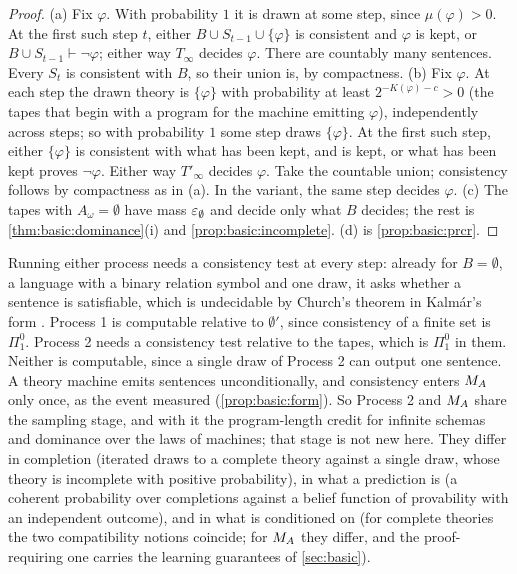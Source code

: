 \begin{proof}
(a) Fix $\varphi$. With probability $1$ it is drawn at some step, since $\mu(\varphi)>0$. At the first such step $t$, either $B\cup S_{t-1}\cup\{\varphi\}$ is consistent and $\varphi$ is kept, or $B\cup S_{t-1}\vdash\neg\varphi$; either way $T_\infty$ decides $\varphi$. There are countably many sentences. Every $S_t$ is consistent with $B$, so their union is, by compactness.
(b) Fix $\varphi$. At each step the drawn theory is $\{\varphi\}$ with probability at least $2^{-K(\varphi)-c}>0$ (the tapes that begin with a program for the machine emitting $\varphi$), independently across steps; so with probability $1$ some step draws $\{\varphi\}$. At the first such step, either $\{\varphi\}$ is consistent with what has been kept, and is kept, or what has been kept proves $\neg\varphi$. Either way $T'_\infty$ decides $\varphi$. Take the countable union; consistency follows by compactness as in (a). In the variant, the same step decides $\varphi$.
(c) The tapes with $A_\omega=\emptyset$ have mass $\varepsilon_{\emptyset}$ and decide only what $B$ decides; the rest is \cref{thm:basic:dominance}(i) and \cref{prop:basic:incomplete}.
(d) is \cref{prop:basic:prcr}.
\end{proof}

Running either process needs a consistency test at every step: already for $B=\emptyset$, a language with a binary relation symbol and one draw, it asks whether a sentence is satisfiable, which is undecidable by Church's theorem in Kalmár's form \citep{church1936note,kalmar1937zuruckfuhrung}. Process 1 is computable relative to $\emptyset'$, since consistency of a finite set is $\Pi^0_1$. Process 2 needs a consistency test relative to the tapes, which is $\Pi^0_1$ in them. Neither is computable, since a single draw of Process 2 can output one sentence. A theory machine emits sentences unconditionally, and consistency enters $M_{A}$ only once, as the event measured (\cref{prop:basic:form}). So Process 2 and $M_{A}$ share the sampling stage, and with it the program-length credit for infinite schemas and dominance over the laws of machines; that stage is not new here. They differ in completion (iterated draws to a complete theory against a single draw, whose theory is incomplete with positive probability), in what a prediction is (a coherent probability over completions against a belief function of provability with an independent outcome), and in what is conditioned on (for complete theories the two compatibility notions coincide; for $M_{A}$ they differ, and the proof-requiring one carries the learning guarantees of \cref{sec:basic}).

